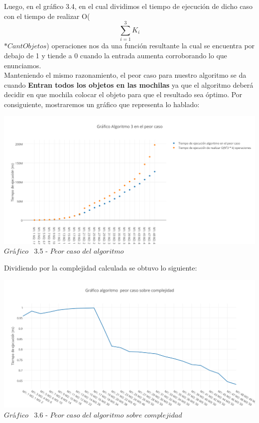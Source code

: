 Luego, en el gr\'afico 3.4, en el cual dividimos el tiempo de ejecuci\'on de dicho caso con el tiempo de realizar O(\[
\sum_{i=1}^{3}K_{i} 
\] $\ast CantObjetos$) operaciones nos da una funci\'on resultante la cual se encuentra por debajo de 1 y tiende a 0 cuando la entrada aumenta corroborando lo que enunciamos.\\

Manteniendo el mismo razonamiento, el peor caso para nuestro algoritmo se da cuando \textbf{Entran todos los objetos en las mochilas} ya que el algoritmo deber\'a decidir en que mochila colocar el objeto para que el resultado sea \'optimo. Por consiguiente, mostraremos un gr\'afico que representa lo hablado:\\

\vspace*{0.3cm} \vspace*{0.3cm}
  \begin{center}
 \includegraphics[scale=0.65]{./EJ3/peorcaso.png}
 {$Gr$\'a$fico$ \ 3.5 - $Peor$ $caso$ $del$ $algoritmo$}
  \end{center}
  \vspace*{0.3cm}

Dividiendo por la complejidad calculada se obtuvo lo siguiente:\\

\vspace*{0.3cm} \vspace*{0.3cm}
  \begin{center}
 \includegraphics[scale=0.65]{./EJ3/peorcaso1.png}
 {$Gr$\'a$fico$ \ 3.6 - $Peor$ $caso$ $del$ $algoritmo$ $sobre$ $complejidad$}
  \end{center}
  \vspace*{0.3cm}
  
